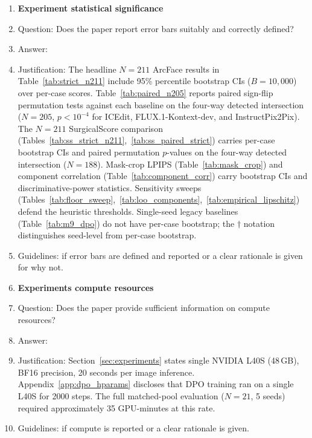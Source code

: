 \begin{enumerate}
\item {\bf Experiment statistical significance}
    \item[] Question: Does the paper report error bars suitably and correctly defined?
    \item[] Answer: \answerYes{}
    \item[] Justification: The headline $N{=}211$ ArcFace results in Table~\ref{tab:strict_n211} include 95\% percentile bootstrap CIs ($B{=}10{,}000$) over per-case scores. Table~\ref{tab:paired_n205} reports paired sign-flip permutation tests against each baseline on the four-way detected intersection ($N{=}205$, $p < 10^{-4}$ for ICEdit, FLUX.1-Kontext-dev, and InstructPix2Pix). The $N{=}211$ SurgicalScore comparison (Tables~\ref{tab:ss_strict_n211},~\ref{tab:ss_paired_strict}) carries per-case bootstrap CIs and paired permutation $p$-values on the four-way detected intersection ($N{=}188$). Mask-crop LPIPS (Table~\ref{tab:mask_crop}) and component correlation (Table~\ref{tab:component_corr}) carry bootstrap CIs and discriminative-power statistics. Sensitivity sweeps (Tables~\ref{tab:floor_sweep},~\ref{tab:loo_components},~\ref{tab:empirical_lipschitz}) defend the heuristic thresholds. Single-seed legacy baselines (Table~\ref{tab:m9_dpo}) do not have per-case bootstrap; the $\dagger$ notation distinguishes seed-level from per-case bootstrap.
    \item[] Guidelines: \answerYes{} if error bars are defined and reported or a clear rationale is given for why not.

\item {\bf Experiments compute resources}
    \item[] Question: Does the paper provide sufficient information on compute resources?
    \item[] Answer: \answerYes{}
    \item[] Justification: Section~\ref{sec:experiments} states single NVIDIA L40S (48\,GB), BF16 precision, 20 seconds per image inference. Appendix~\ref{app:dpo_hparams} discloses that DPO training ran on a single L40S for 2000 steps. The full matched-pool evaluation ($N{=}21$, 5 seeds) required approximately 35 GPU-minutes at this rate.
    \item[] Guidelines: \answerYes{} if compute is reported or a clear rationale is given.


\end{enumerate}
